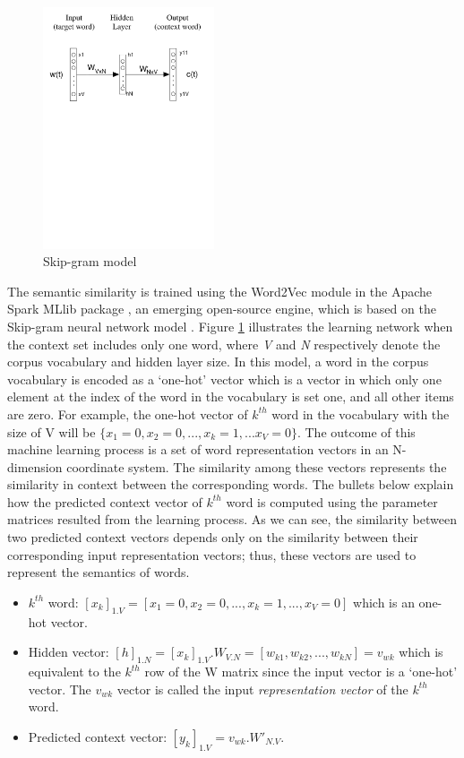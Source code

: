 \documentclass[Journal, BackFigs,NoLists, DoubleSpace]{ascelike}%
\begin{document}
%
\begin{figure}[t]
	\centering
	\includegraphics[width=0.45\textwidth]{Figure4_skip-gram-model}
	\caption{Skip-gram model}
	\label{fig:skip-gram}
\end{figure}
%
The semantic similarity is trained using the Word2Vec module in the Apache Spark MLlib package \cite{apache16}, an emerging open-source engine, which is based on the Skip-gram neural network model \cite{mikolov13a}. Figure \ref{fig:skip-gram} illustrates the learning network when the context set includes only one word, where \textit{V} and \textit{N} respectively denote the corpus vocabulary and hidden layer size. In this model, a word in the corpus vocabulary is encoded as a `one-hot' vector which is a vector in which only one element at the index of the word in the vocabulary is set one, and all other items are zero. For example, the one-hot vector of $k^{th}$ word in the vocabulary with the size of V will be $\{x_1=0, x_2=0, ..., x_k=1,...x_V=0\}$. The outcome of this machine learning process is a set of word representation vectors in an N-dimension coordinate system. The similarity among these vectors represents the similarity in context between the corresponding words. The bullets below explain how the predicted context vector of $k^{th}$ word is computed using the parameter matrices resulted from the learning process. As we can see, the similarity between two predicted context vectors depends only on the similarity between their corresponding input representation vectors; thus, these vectors are used to represent the semantics of  words. 
%
\begin{itemize}
	\item $k^{th}$ word: $[x_k]_{1.V} = [x_1=0, x_2=0,...,x_k=1,..., x_V=0]$ which is an one-hot vector.
	\item Hidden vector: $[h]_{1.N} = [x_k]_{1.V}.W_{V.N} = [w_{k1},w_{k2},..., w_{kN}]= v_{wk}$ which is equivalent to the $k^{th}$ row of the W matrix since the input vector is a `one-hot' vector. The $v_{wk}$ vector is called the input \textit{representation vector} of the $k^{th}$ word.
	\item Predicted context vector: $[y_k]_{1.V} = v_{wk}.W'_{N.V}$. 
\end{itemize}
\end{document}
